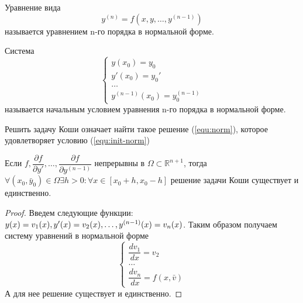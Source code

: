 	\begin{definition}
		Уравнение вида
		\begin{equation}
			\label{equ:norm}
			y^{(n)} = f(x, y, \dots, y^{(n-1)})
		\end{equation}
		называется уравнением n-го порядка в нормальной форме.
	\end{definition}

	\begin{definition}
		Система
		\begin{equation}
			\label{equ:init-norm}
			\begin{cases*}
				y(x_0) = y_0\\
				y'(x_0) = y_0'\\
				\dots \\
				y^{(n-1)}(x_0) = y^{(n-1)}_0
			\end{cases*}
		\end{equation}
		называется начальным условием уравнения n-го порядка в нормальной форме.
	\end{definition}

	\begin{proposition}
		Решить задачу Коши означает найти такое решение (\ref{equ:norm}), которое удовлетворяет условию (\ref{equ:init-norm})
	\end{proposition}

	\begin{theorem}
		Если $f, \dfrac{\partial f}{\partial y'}, \dots, \dfrac{\partial f}{\partial y^{(n-1)}}$ непрерывны в $\Omega \subset \mathbb{R}^{n+1}$, тогда $\forall (x_0, \bar{y}_0) \in \Omega \exists h > 0: \forall x\in [x_0 +h, x_0-h]$ решение задачи Коши существует и единственно.
	\end{theorem}

	\begin{proof}
		Введем следующие функции: $y(x) = v_1(x), y'(x) = v_2(x), \dots, y^{(n-1)}(x) \hm= v_n(x)$. Таким образом получаем систему уравнений в нормальной форме
		\begin{equation*}
			\begin{cases*}
				\dfrac{dv_1}{dx} = v_2\\
				\dots\\
				\dfrac{dv_n}{dx} = f(x, \bar{v})
			\end{cases*}
		\end{equation*}
		А для нее решение существует и единственно.
	\end{proof}
	
	
	
	
	
	
	
	
	
	
	
	
